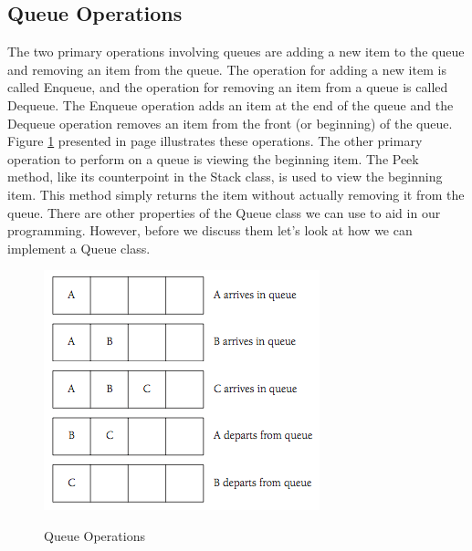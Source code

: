 \documentclass[12pt,a4paper,final,twoside,titlepage]{book}
\begin{document}
\subsection{Queue Operations}
The two primary operations involving queues are adding a new item to the queue and removing an item from the queue. The operation for adding a new item is called Enqueue, and the operation for removing an item from a queue is called Dequeue. The Enqueue operation adds an item at the end of the queue and the Dequeue operation removes an item from the front (or beginning) of the queue. Figure \ref{QueueOperations-} presented in page \pageref{QueueOperations-}  illustrates these operations.
The other primary operation to perform on a queue is viewing the beginning item. The Peek method, like its counterpoint in the Stack class, is used to view the beginning item. This method simply returns the item without actually removing it from the queue.
There are other properties of the Queue class we can use to aid in our programming. However, before we discuss them let’s look at how we can implement a Queue class.
\begin{figure}
\begin{center}
\includegraphics[scale=0.75]{QueueOperations-}
\label{QueueOperations-}
\caption{Queue Operations}
\end{center}
\end{figure}
\end{document}
